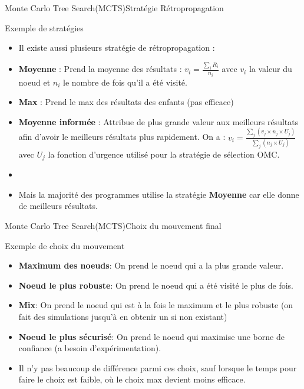 \begin{frame}{Monte Carlo Tree Search(MCTS)}{Stratégie Rétropropagation}
	\begin{block}{Exemple de stratégies}
		\begin{itemize}
			\item Il existe aussi plusieurs stratégie de rétropropagation :
			\item \textbf{Moyenne} : Prend la moyenne des résultats : $v_{i} = \frac{\sum_{i}^{}R_{i}}{n_{i}}$ avec $v_{i}$ la valeur du noeud et $n_i$ le nombre de fois qu'il a été visité.
			\item \textbf{Max} : Prend le max des résultats des enfants (pas efficace)
			\item \textbf{Moyenne informée} : Attribue de plus grande valeur aux meilleurs résultats afin d'avoir le meilleurs résultats plus rapidement.
			On a : $v_{i} = \frac{\sum_{j}^{}(v_{j}\times n_{j}\times U_{j})}{\sum_{j}^{}(n_{j}\times U_{j})}$ avec $U_{j}$ la fonction d'urgence utilisé pour la stratégie de sélection OMC.
			\item \
			\item Mais la majorité des programmes utilise la stratégie \textbf{Moyenne} car elle donne de meilleurs résultats.
		\end{itemize}
	\end{block}
\end{frame}

\begin{frame}{Monte Carlo Tree Search(MCTS)}{Choix du mouvement final}
	\begin{block}{Exemple de choix du mouvement}
		\begin{itemize}
			\item \textbf{Maximum des noeuds}: On prend le noeud qui a la plus grande valeur.
			\item \textbf{Noeud le plus robuste}: On prend le noeud qui a été visité le plus de fois.
			\item \textbf{Mix}: On prend le noeud qui est à la fois le maximum et le plus robuste (on fait des simulations jusqu'à en obtenir un si non existant)
			\item \textbf{Noeud le plus sécurisé}: On prend le noeud qui maximise une borne de confiance (a besoin d'expérimentation).
			\item Il n'y pas beaucoup de différence parmi ces choix, sauf lorsque le temps pour faire le choix est faible, où le choix max devient moins efficace.
		\end{itemize}
	\end{block}
\end{frame}

